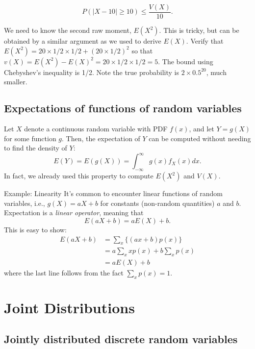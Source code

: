 \documentclass[
]{book}
\begin{document}
\[P(|X - 10|\geq 10)\leq \frac{V(X)}{10}.\]

We need to know the second raw moment, \(E(X^2)\). This is tricky, but can be obtained by a similar argument as we used to derive \(E(X)\). Verify that \(E(X^2) = 20\times 1/2 \times 1/2 + (20\times 1/2)^2\) so that \(v(X) = E(X^2) - E(X)^2 = 20\times 1/2 \times 1/2 = 5\). The bound using Chebyshev's inequality is 1/2. Note the true probability is \(2\times 0.5^{20}\), much smaller.

\hypertarget{expectations-of-functions-of-random-variables}{%
\section{Expectations of functions of random variables}\label{expectations-of-functions-of-random-variables}}

Let \(X\) denote a continuous random variable with PDF \(f(x)\), and let \(Y = g(X)\) for some function \(g\). Then, the expectation of \(Y\) can be computed without needing to find the density of \(Y\):
\[E(Y) = E(g(X)) = \int_{-\infty}^\infty g(x)f_X(x)dx.\]
In fact, we already used this property to compute \(E(X^2)\) and \(V(X)\).

Example: Linearity
It's common to encounter linear functions of random variables, i.e., \(g(X) = aX+b\) for constants (non-random quantities) \(a\) and \(b\). Expectation is a \emph{linear operator}, meaning that
\[E(aX+b) = aE(X)+b.\]
This is easy to show:
\begin{align*}
E(aX+b)&= \sum_x \{(ax+b)p(x)\}\\
& = a\sum_x xp(x) + b\sum_x p(x)\\
& = aE(X) + b
\end{align*}
where the last line follows from the fact \(\sum_x p(x)=1\).

\hypertarget{joint-distributions}{%
\chapter{Joint Distributions}\label{joint-distributions}}

\hypertarget{jointly-distributed-discrete-random-variables}{%
\section{Jointly distributed discrete random variables}\label{jointly-distributed-discrete-random-variables}}
\end{document}
